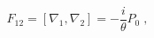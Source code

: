 \begin{equation}
\label{curvature}
F_{12}=[\nabla_1,\nabla_2]= -\frac{i}{\theta}P_0\;,
\end{equation}

